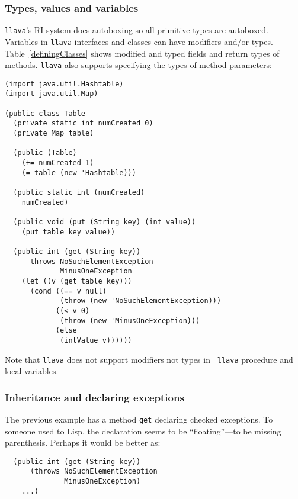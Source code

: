 \documentclass{acm-final/sig-alternate-modified}
\begin{document}
\subsubsection{Types, values and variables}

{\tt llava}'s RI system does autoboxing so all primitive types are
autoboxed.  Variables in {\tt llava} interfaces and classes can have
modifiers and/or types.  Table~\ref{definingClasses} shows modified
and typed fields and return types of methods.  {\tt llava} also
supports specifying the types of method parameters:

\small
\begin{verbatim}
(import java.util.Hashtable)
(import java.util.Map)

(public class Table
  (private static int numCreated 0)
  (private Map table)

  (public (Table)
    (+= numCreated 1)
    (= table (new 'Hashtable)))

  (public static int (numCreated)
    numCreated)

  (public void (put (String key) (int value))
    (put table key value))

  (public int (get (String key)) 
      throws NoSuchElementException
             MinusOneException
    (let ((v (get table key)))
      (cond ((== v null)
             (throw (new 'NoSuchElementException)))
            ((< v 0)
             (throw (new 'MinusOneException)))
            (else
             (intValue v))))))
\end{verbatim}
\normalsize

Note that {\tt llava} does not support modifiers not types in {\tt
llava} procedure and local variables.

\subsubsection{Inheritance and declaring exceptions}

The previous example has a method {\tt get} declaring checked
exceptions.  To someone used to Lisp, the declaration seems to be
``floating''---to be missing parenthesis.  Perhaps it would be better
as:

\small
\begin{verbatim}
  (public int (get (String key)) 
      (throws NoSuchElementException
              MinusOneException)
    ...)
\end{verbatim}
\normalsize
\end{document}
